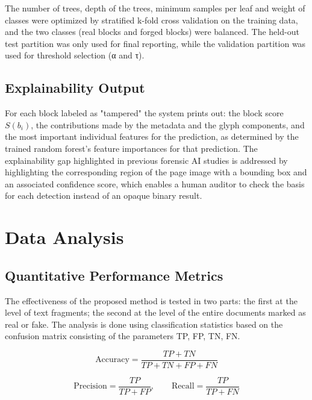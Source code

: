 \noindent The number of trees, depth of the trees, minimum samples per leaf and weight of classes were optimized by stratified k-fold cross validation on the training data, and the two classes (real blocks and forged blocks) were balanced. The held-out test partition was only used for final reporting, while the validation partition was used for threshold selection (α and τ).

\subsection{Explainability Output}

For each block labeled as "tampered" the system prints out: the block score \(S(b_i)\), the contributions made by the metadata and the glyph components, and the most important individual features for the prediction, as determined by the trained random forest's feature importances for that prediction. The explainability gap highlighted in previous forensic AI studies \cite{Luo2024Explainable,Nikkel2020Fintech} is addressed by highlighting the corresponding region of the page image with a bounding box and an associated confidence score, which enables a human auditor to check the basis for each detection instead of an opaque binary result.

\section{Data Analysis}
\label{sec:data-analysis}

\subsection{Quantitative Performance Metrics}

The effectiveness of the proposed method is tested in two parts: the first at the level of text fragments; the second at the level of the entire documents marked as real or fake. The analysis is done using classification statistics based on the confusion matrix consisting of the parameters TP, FP, TN, FN.

\begin{equation}
\text{Accuracy} = \frac{TP + TN}{TP + TN + FP + FN}
\end{equation}

\begin{equation}
\text{Precision} = \frac{TP}{TP + FP}, \qquad \text{Recall} = \frac{TP}{TP + FN}
\end{equation}

